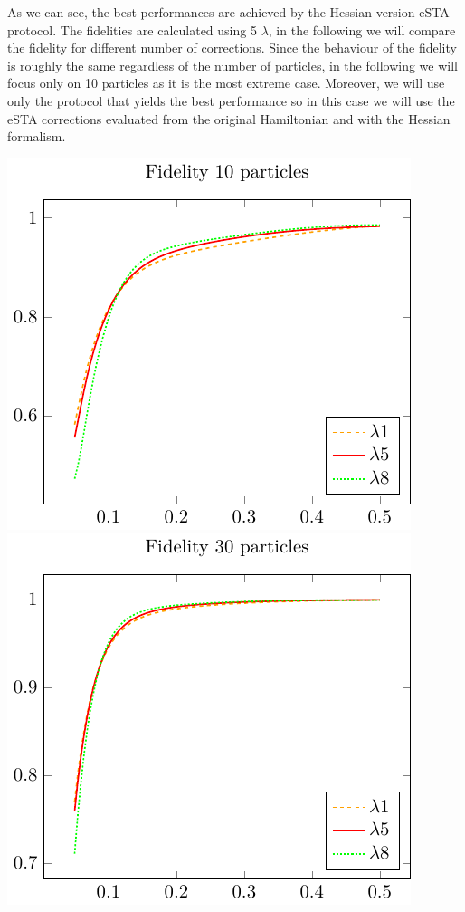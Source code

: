 \documentclass{article}
\begin{document}
As we can see, the best performances are achieved by the Hessian version eSTA protocol.
The fidelities are calculated using 5 $ \lambda $, in the following we will compare the fidelity for different number of corrections.
Since the behaviour of the fidelity is roughly the same regardless of the number of particles, in the following we will focus only on 10 particles as it is the most extreme case.
Moreover, we will use only the protocol that yields the best performance so in this case we will use the eSTA corrections evaluated from the original Hamiltonian and with the Hessian formalism.

\includegraphics{./gfx/fidelity_compare10.pdf}
\includegraphics{./gfx/fidelity_compare30.pdf}
\end{document}

